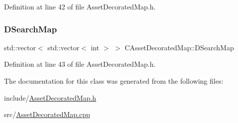 Definition at line 42 of file Asset\+Decorated\+Map.\+h.

\hypertarget{classCAssetDecoratedMap_a7e6c8b62a9f83cec4bc77dc833d5787a}{}\label{classCAssetDecoratedMap_a7e6c8b62a9f83cec4bc77dc833d5787a} 
\subsubsection{\texorpdfstring{D\+Search\+Map}{DSearchMap}}
{\footnotesize\ttfamily std\+::vector$<$ std\+::vector$<$ int $>$ $>$ C\+Asset\+Decorated\+Map\+::\+D\+Search\+Map\hspace{0.3cm}{\ttfamily [protected]}}



Definition at line 43 of file Asset\+Decorated\+Map.\+h.



The documentation for this class was generated from the following files\+:\begin{DoxyCompactItemize}
\item 
include/\hyperlink{AssetDecoratedMap_8h}{Asset\+Decorated\+Map.\+h}\item 
src/\hyperlink{AssetDecoratedMap_8cpp}{Asset\+Decorated\+Map.\+cpp}\end{DoxyCompactItemize}
